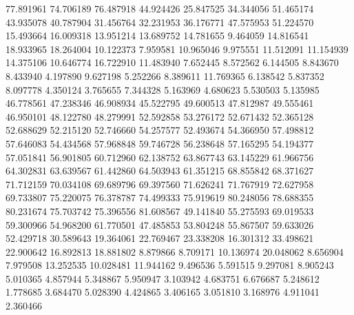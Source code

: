 77.891961
74.706189
76.487918
44.924426
25.847525
34.344056
51.465174
43.935078
40.787904
31.456764
32.231953
36.176771
47.575953
51.224570
15.493664
16.009318
13.951214
13.689752
14.781655
9.464059
14.816541
18.933965
18.264004
10.122373
7.959581
10.965046
9.975551
11.512091
11.154939
14.375106
10.646774
16.722910
11.483940
7.652445
8.572562
6.144505
8.843670
8.433940
4.197890
9.627198
5.252266
8.389611
11.769365
6.138542
5.837352
8.097778
4.350124
3.765655
7.344328
5.163969
4.680623
5.530503
5.135985
46.778561
47.238346
46.908934
45.522795
49.600513
47.812987
49.555461
46.950101
48.122780
48.279991
52.592858
53.276172
52.671432
52.365128
52.688629
52.215120
52.746660
54.257577
52.493674
54.366950
57.498812
57.646083
54.434568
57.968848
59.746728
56.238648
57.165295
54.194377
57.051841
56.901805
60.712960
62.138752
63.867743
63.145229
61.966756
64.302831
63.639567
61.442860
64.503943
61.351215
68.855842
68.371627
71.712159
70.034108
69.689796
69.397560
71.626241
71.767919
72.627958
69.733807
75.220075
76.378787
74.499333
75.919619
80.248056
78.688355
80.231674
75.703742
75.396556
81.608567
49.141840
55.275593
69.019533
59.300966
54.968200
61.770501
47.485853
53.804248
55.867507
59.633026
52.429718
30.589643
19.364061
22.769467
23.338208
16.301312
33.498621
22.900642
16.892813
18.881802
8.879866
8.709171
10.136974
20.048062
8.656904
7.979508
13.252535
10.028481
11.944162
9.496536
5.591515
9.297081
8.905243
5.010365
4.857944
5.348867
5.950947
3.103942
4.683751
6.676687
5.248612
1.778685
3.684470
5.028390
4.424865
3.406165
3.051810
3.168976
4.911041
2.360466
